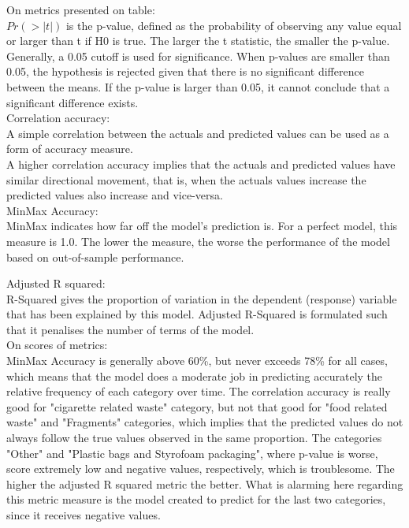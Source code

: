 \documentclass[10pt]{article}\usepackage[]{graphicx}\usepackage[]{color}
\begin{document}
On metrics presented on table:\\

$Pr(>|t|)$ is the p-value, defined as the probability of observing any value equal or larger than t if H0 is true. The larger the t statistic, the smaller the p-value. Generally, a 0.05 cutoff is used for significance. When p-values are smaller than 0.05, the hypothesis is rejected given that there is no significant difference between the means. If the p-value is larger than 0.05, it cannot conclude that a significant difference exists.\\

Correlation accuracy:\\
A simple correlation between the actuals and predicted values can be used as a form of accuracy measure.\\
A higher correlation accuracy implies that the actuals and predicted values have similar directional movement, that is, when the actuals values increase the predicted values also increase and vice-versa.\\

MinMax Accuracy:\\
MinMax indicates how far off the model's prediction is. For a perfect model, this measure is 1.0. The lower the measure, the worse the performance of the model based on out-of-sample performance.

Adjusted R squared:\\
R-Squared gives the proportion of variation in the dependent (response) variable that has been explained by this model. Adjusted R-Squared is formulated such that it penalises the number of terms of the model.\\


On scores of metrics:\\

MinMax Accuracy is generally above 60\%, but never exceeds 78\% for all cases, which means that the model does a moderate job in predicting accurately the relative frequency of each category over time. The correlation accuracy is really good for "cigarette related waste" category, but not that good for "food related waste" and "Fragments" categories, which implies that the predicted values do not always follow the true values observed in the same proportion. The categories "Other" and "Plastic bags and Styrofoam packaging", where p-value is worse, score extremely low and negative values, respectively, which is troublesome. The higher the adjusted R squared metric the better. What is alarming here regarding this metric measure is the model created to predict for the last two categories, since it receives negative values.\\
\end{document}
